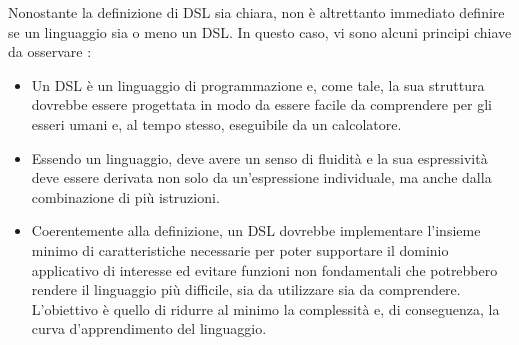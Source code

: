 \documentclass[12pt,a4paper,openright,twoside]{book}
\begin{document}
Nonostante la definizione di \ac{DSL} sia chiara, non è altrettanto immediato definire se un linguaggio sia o meno un \ac{DSL}. In questo caso, 
vi sono alcuni principi chiave da osservare \cite{Fowler2010}:
\begin{itemize}
    \item Un \ac{DSL} è un linguaggio di programmazione e, come tale, la sua struttura dovrebbe essere progettata in modo da essere facile da 
    comprendere per gli esseri umani e, al tempo stesso, eseguibile da un calcolatore.
    \item Essendo un linguaggio, deve avere un senso di fluidità e la sua espressività deve essere derivata non solo da un’espressione 
    individuale, ma anche dalla combinazione di più istruzioni.
    \item Coerentemente alla definizione, un \ac{DSL} dovrebbe implementare l'insieme minimo di caratteristiche necessarie per poter supportare 
    il dominio applicativo di interesse ed evitare funzioni non fondamentali che potrebbero rendere il linguaggio più difficile, 
    sia da utilizzare sia da comprendere. L'obiettivo è quello di ridurre al minimo la complessità e, di conseguenza, la curva d'apprendimento 
    del linguaggio.
\end{itemize}
\end{document}
